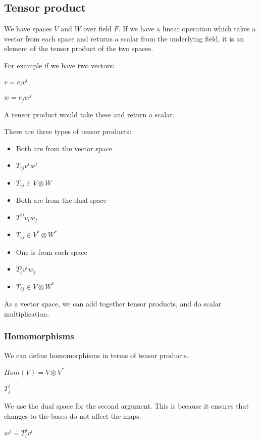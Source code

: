 
\subsection{Tensor product}

We have spaces \(V\) and \(W\) over field \(F\). If we have a linear operation which takes a vector from each space and returns a scalar from the underlying field, it is an element of the tensor product of the two spaces.

For example if we have two vectors:

\(v=e_iv^i\)

\(w=e_jw^j\)

A tensor product would take these and return a scalar.

There are three types of tensor products:

\begin{itemize}
\item Both are from the vector space
\item \(T_{ij}v^iw^j\)
\item \(T_{ij} \in V\otimes W\)
\item Both are from the dual space
\item \(T^{ij}v_iw_j\)
\item \(T_{ij} \in V^*\otimes W^*\)
\item One is from each space
\item \(T_i^jv^iw_j\)
\item \(T_{ij} \in V\otimes W^*\)
\end{itemize}


As a vector space, we can add together tensor products, and do scalar multiplication.

\subsubsection{Homomorphisms}

We can define homomorphisms in terms of tensor products.

\(Hom (V) =V \otimes V^*\)

\(T_j^i\)

We use the dual space for the second argument. This is because it ensures that changes to the bases do not affect the maps.

\(w^j=T_i^j v^i\)

